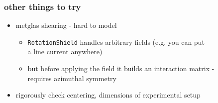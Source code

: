 \documentclass{beamer}
\begin{document}
\begin{frame}
\frametitle{other things to try} \pause

    \begin{itemize}
    \item metglas shearing - hard to model \pause
        \begin{itemize}
        \item \texttt{RotationShield} handles arbitrary fields (e.g. you can put \\ a line
        current anywhere) \pause
        \item but before applying the field it builds an interaction matrix - \\ requires
        azimuthal symmetry \pause
        \end{itemize}
    \item rigorously check centering, dimensions of experimental setup
    \end{itemize}

\end{frame}
\end{document}
